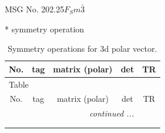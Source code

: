\documentclass[fleqn,8pt]{jsarticle}
\begin{document}
\setcounter{MaxMatrixCols}{32}

\renewcommand{\tablename}{Table~}
\renewcommand{\figurename}{Figure~}
\begin{center}
\LARGE
MSG No. 202.25\quad$F_{S}m\bar{3}$
\end{center}
* symmetry operation
\renewcommand{\arraystretch}{1.3}
\begin{longtable}{ccccc}
\caption{Symmetry operations for 3d polar vector.}
 \\
 \hline \hline
No. & tag & matrix (polar) & det & TR \\ \hline \endfirsthead

\multicolumn{4}{l}{\tablename\ \thetable{}} \\
 \hline \hline
No. & tag & matrix (polar) & det & TR \\ \hline \endhead

 \hline \hline
\multicolumn{4}{r}{\footnotesize\it continued ...} \\ \endfoot

 \hline \hline
\multicolumn{4}{r}{} \\ \endlastfoot


\end{longtable}
\end{document}
